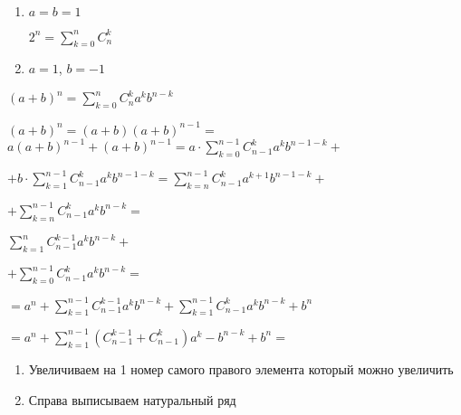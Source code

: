 \begin{enumerate}
    \item $a = b = 1$

$2^n = \sum_{k = 0}^{n}C_n^k$

    \item $a = 1$, $b = -1$
    
\end{enumerate}


$(a + b)^n = \sum_{k = 0}^{n}C_n^k a^k b^{n-k}$

$(a + b)^n = (a+b)(a+b)^{n-1} = $
$a(a +b)^{n- 1} + (a + b)^{n - 1} = a \cdot \sum_{k = 0}^{n - 1}C_{n-1}^k a^k b^{n-1-k} +$

$+ b \cdot \sum_{k = 1}^{n-1}C_{n-1}^k a^k b^{n-1-k} = \sum_{k = n}^{n - 1} C_{n-1}^k a^{k + 1} b^{n-1-k} +$

$+ \sum_{k=n}^{n - 1} C_{n-1}^k a^k b^{n-k} = $

$\sum_{k = 1}^{n} C_{n-1}^{k-1} a^k b^{n-k} +$

$+ \sum_{k = 0}^{n - 1} C_{n-1}^k a^k b^{n-k} =$

$= a^n + \sum_{k = 1}^{n - 1} C_{n - 1}^{k-1} a^k b^{n-k} + \sum_{k = 1}^{n - 1} C_{n-1}^k a^k b^{n-k} + b^n$

$= a^n + \sum_{k = 1}^{n - 1}(C_{n-1}^{k-1} + C_{n-1}^k) a^k - b^{n-k} + b^n = $


\begin{enumerate}
    \item Увеличиваем на 1 номер самого правого элемента который можно увеличить
    \item Справа выписываем натуральный ряд
\end{enumerate}



